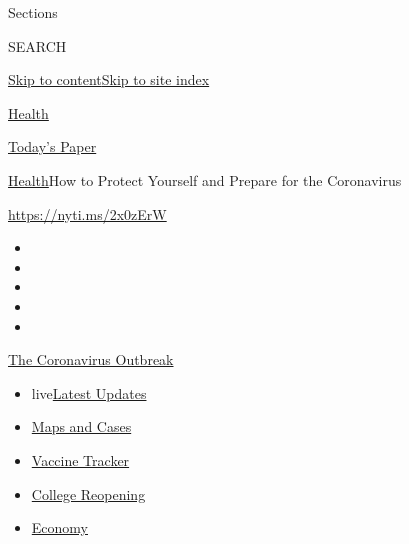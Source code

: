 Sections

SEARCH

\protect\hyperlink{site-content}{Skip to
content}\protect\hyperlink{site-index}{Skip to site index}

\href{https://www.nytimes.com/section/health}{Health}

\href{https://myaccount.nytimes.com/auth/login?response_type=cookie\&client_id=vi}{}

\href{https://www.nytimes.com/section/todayspaper}{Today's Paper}

\href{/section/health}{Health}\textbar{}How to Protect Yourself and
Prepare for the Coronavirus

\url{https://nyti.ms/2x0zErW}

\begin{itemize}
\item
\item
\item
\item
\item
\end{itemize}

\href{https://www.nytimes.com/news-event/coronavirus?action=click\&pgtype=Article\&state=default\&region=TOP_BANNER\&context=storylines_menu}{The
Coronavirus Outbreak}

\begin{itemize}
\tightlist
\item
  live\href{https://www.nytimes.com/2020/08/04/world/coronavirus-cases.html?action=click\&pgtype=Article\&state=default\&region=TOP_BANNER\&context=storylines_menu}{Latest
  Updates}
\item
  \href{https://www.nytimes.com/interactive/2020/us/coronavirus-us-cases.html?action=click\&pgtype=Article\&state=default\&region=TOP_BANNER\&context=storylines_menu}{Maps
  and Cases}
\item
  \href{https://www.nytimes.com/interactive/2020/science/coronavirus-vaccine-tracker.html?action=click\&pgtype=Article\&state=default\&region=TOP_BANNER\&context=storylines_menu}{Vaccine
  Tracker}
\item
  \href{https://www.nytimes.com/2020/08/02/us/covid-college-reopening.html?action=click\&pgtype=Article\&state=default\&region=TOP_BANNER\&context=storylines_menu}{College
  Reopening}
\item
  \href{https://www.nytimes.com/live/2020/08/04/business/stock-market-today-coronavirus?action=click\&pgtype=Article\&state=default\&region=TOP_BANNER\&context=storylines_menu}{Economy}
\end{itemize}

